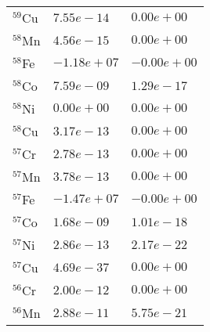 \begin{tabular}{lll}
 $^{59}$Cu & $7.55e-14 $                                                        & $0.00e+00 $                                                           \\
 $^{58}$Mn & $4.56e-15 $                                                        & $0.00e+00 $                                                           \\
 $^{58}$Fe & $-1.18e+07 $                                                       & $-0.00e+00 $                                                          \\
 $^{58}$Co & $7.59e-09 $                                                        & $1.29e-17 $                                                           \\
 $^{58}$Ni & $0.00e+00 $                                                        & $0.00e+00 $                                                           \\
 $^{58}$Cu & $3.17e-13 $                                                        & $0.00e+00 $                                                           \\
 $^{57}$Cr & $2.78e-13 $                                                        & $0.00e+00 $                                                           \\
 $^{57}$Mn & $3.78e-13 $                                                        & $0.00e+00 $                                                           \\
 $^{57}$Fe & $-1.47e+07 $                                                       & $-0.00e+00 $                                                          \\
 $^{57}$Co & $1.68e-09 $                                                        & $1.01e-18 $                                                           \\
 $^{57}$Ni & $2.86e-13 $                                                        & $2.17e-22 $                                                           \\
 $^{57}$Cu & $4.69e-37 $                                                        & $0.00e+00 $                                                           \\
 $^{56}$Cr & $2.00e-12 $                                                        & $0.00e+00 $                                                           \\
 $^{56}$Mn & $2.88e-11 $                                                        & $5.75e-21 $                                                           \\

\end{tabular}
